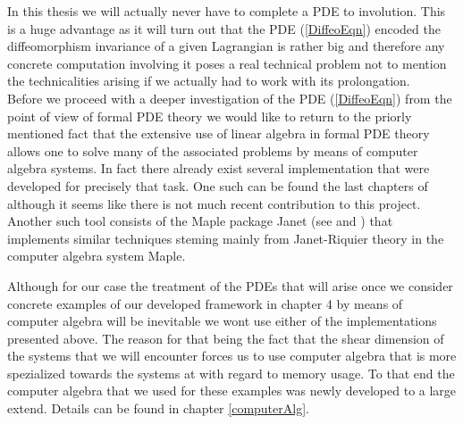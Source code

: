 \documentclass[a4paper,12pt, DIV=14, BCOR=5mm, twoside, headsepline]{scrbook}
\begin{document}
In this thesis we will actually never have to complete a PDE to involution. This is a huge advantage as it will turn out that the PDE (\ref{DiffeoEqn}) encoded the diffeomorphism invariance of a given Lagrangian is rather big and therefore any concrete computation involving it poses a real technical problem not to mention the technicalities arising if we actually had to work with its prolongation. \\

Before we proceed with a deeper investigation of the PDE (\ref{DiffeoEqn}) from the point of view of formal PDE theory we would like to return to the priorly mentioned fact that the extensive use of linear algebra in formal PDE theory allows one to solve many of the associated problems by means of computer algebra systems. In fact there already exist several implementation that were developed for precisely that task. One such can be found the last chapters of \cite{seiler1994analysis} although it seems like there is not much recent contribution to this project. Another such tool consists of the Maple package Janet (see \cite{Janet2} and \cite{Janet}) that implements similar techniques steming mainly from Janet-Riquier theory in the computer algebra system Maple. 

Although for our case the treatment of the PDEs that will arise once we consider concrete examples of our developed framework in chapter 4 by means of computer algebra will be inevitable we wont use either of the implementations presented above. The reason for that being the fact that the shear dimension of the systems that we will encounter forces us to use computer algebra that is more spezialized towards the systems at with regard to memory usage. To that end the computer algebra that we used for these examples was newly developed to a large extend. Details can be found in chapter \ref{computerAlg}.    
\end{document}
